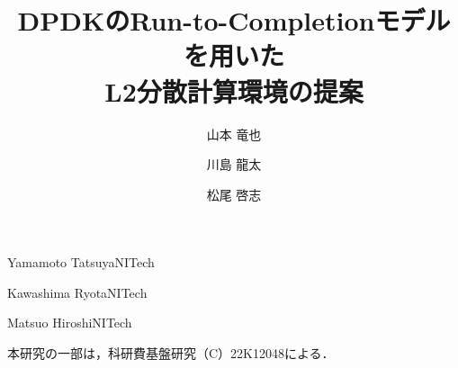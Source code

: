 \documentclass[submit,techrep,noauthor]{ipsj}
\begin{document}
\title{DPDKのRun-to-Completionモデルを用いた\\L2分散計算環境の提案}

\author{山本 竜也}{Yamamoto Tatsuya}{NITech}
\author{川島 龍太}{Kawashima Ryota}{NITech}
\author{松尾 啓志}{Matsuo Hiroshi}{NITech}



\maketitle











\begin{acknowledgment}
  本研究の一部は，科研費基盤研究（C）22K12048による．
\end{acknowledgment}



\end{document}
